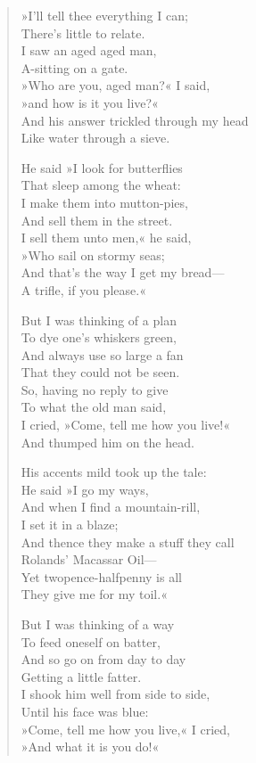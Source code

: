 \begin{verse}
»I'll tell thee everything I can;\\
\vin There's little to relate.\\
I saw an aged aged man,\\
\vin A-sitting on a gate.\\
»Who are you, aged man?« I said,\\
\vin »and how is it you live?«\\
And his answer trickled through my head\\
\vin Like water through a sieve.

He said »I look for butterflies\\
\vin That sleep among the wheat:\\
I make them into mutton-pies,\\
\vin And sell them in the street.\\
I sell them unto men,« he said,\\
\vin »Who sail on stormy seas;\\
And that's the way I get my bread—\\
\vin A trifle, if you please.«

But I was thinking of a plan\\
\vin To dye one's whiskers green,\\
And always use so large a fan\\
\vin That they could not be seen.\\
So, having no reply to give\\
\vin To what the old man said,\\
I cried, »Come, tell me how you live!«\\
\vin And thumped him on the head.

His accents mild took up the tale:\\
\vin He said »I go my ways,\\
And when I find a mountain-rill,\\
\vin I set it in a blaze;\\
And thence they make a stuff they call\\
\vin Rolands' Macassar Oil—\\
Yet twopence-halfpenny is all\\
\vin They give me for my toil.«

But I was thinking of a way\\
\vin To feed oneself on batter,\\
And so go on from day to day\\
\vin Getting a little fatter.\\
I shook him well from side to side,\\
\vin Until his face was blue:\\
»Come, tell me how you live,« I cried,\\
\vin »And what it is you do!«


\end{verse}
